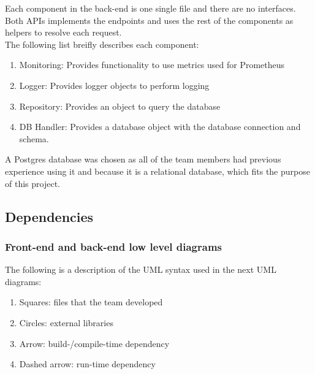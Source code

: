 Each component in the back-end is one single file and there are no interfaces. Both APIs implements the endpoints and uses the rest of the components as helpers to resolve each request.\\
The following list breifly describes each component:
\begin{enumerate}
    \item Monitoring: Provides functionality to use metrics used for Prometheus
    \item Logger: Provides logger objects to perform logging
    \item Repository: Provides an object to query the database
    \item DB Handler: Provides a database object with the database connection and schema.
\end{enumerate}

A Postgres database was chosen as all of the team members had previous experience using it and because it is a relational database, which fits the purpose of this project.

\newpage
\subsection{Dependencies}

\subsubsection{Front-end and back-end low level diagrams}
The following is a description of the UML syntax used in the next UML diagrams:
\begin{enumerate}
    \item Squares: files that the team developed
    \item Circles: external libraries
    \item Arrow: build-/compile-time dependency
    \item Dashed arrow: run-time dependency
\end{enumerate}

